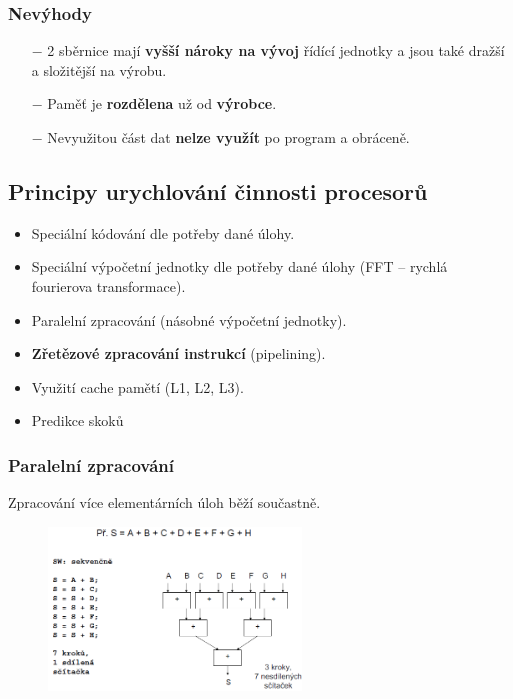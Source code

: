 \subsubsection*{Nevýhody}
\begin{itemize}
\item[$-$]2 sběrnice mají \textbf{vyšší nároky na vývoj} řídící jednotky a jsou také dražší a složitější na výrobu.
\item[$-$]Paměť je \textbf{rozdělena} už od \textbf{výrobce}.
\item[$-$]Nevyužitou část dat \textbf{nelze využít }po program a obráceně.
\end{itemize}

\pagebreak
\subsection{Principy urychlování činnosti procesorů}
\begin{itemize}
	\item{Speciální kódování dle potřeby dané úlohy}.
	\item{Speciální výpočetní jednotky dle potřeby dané úlohy (FFT -- rychlá fourierova transformace)}.
	\item{Paralelní zpracování (násobné výpočetní jednotky)}.
	\item{\textbf{Zřetězové zpracování instrukcí} (pipelining)}.
	\item{Využití cache pamětí (L1, L2, L3)}.
	\item{Predikce skoků}
\end{itemize}
\subsubsection{Paralelní zpracování}
Zpracování více elementárních úloh běží součastně.
\begin{figure}[H]
\centering
\includegraphics[width=0.6\textwidth]{assets/1_paralelni_zpracovani.png}
\end{figure}

